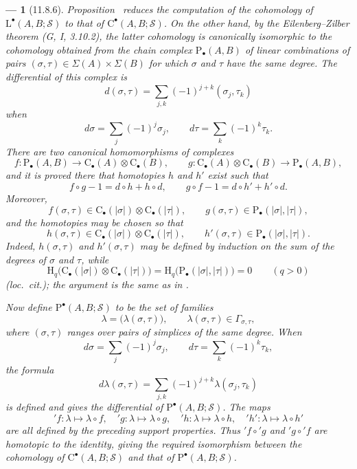 \documentclass[oneside]{amsart}
\theoremstyle{ega-env-style}
\newtheorem*{env}{---}
\theoremstyle{ega-thm-env-style}
\theoremstyle{ega-defn-env-style}
\def\mathcal{\mathscr}
\def\sh{\mathcal}                   %
\def\HH{\mathrm{H}}                 %
\newcommand{\oldpage}[2][]{{\marginnote{\normalfont{\textbf{#1}~|~#2}}}\ignorespaces}
\let\EGAOriginalLabel\label
\renewcommand{\label}[1]{\phantomsection\EGAOriginalLabel{#1}}
\begin{document}
\begin{env}[11.8.6]
\label{0.11.8.6}
\oldpage[0\textsubscript{III}]{45}
Proposition~ reduces the computation of the cohomology of
$\mathrm{L}^\bullet(A,B;\sh{S})$ to that of
$\mathrm{C}^\bullet(A,B;\sh{S})$.
On the other hand, by the Eilenberg--Zilber theorem
(G, I, 3.10.2), the latter cohomology is canonically isomorphic to the
cohomology obtained from the chain complex
$\mathrm{P}_\bullet(A,B)$ of linear combinations of pairs
$(\sigma,\tau)\in\Sigma(A)\times\Sigma(B)$ for which $\sigma$ and
$\tau$ have the same degree.
The differential of this complex is
\[
  d(\sigma,\tau)
  =
  \sum_{j,k}(-1)^{j+k}(\sigma_j,\tau_k)
\]
when
\[
  d\sigma=\sum_j(-1)^j\sigma_j,
  \qquad
  d\tau=\sum_k(-1)^k\tau_k.
\]
There are two canonical homomorphisms of complexes
\[
  f:\mathrm{P}_\bullet(A,B)
  \longrightarrow
  \mathrm{C}_\bullet(A)\otimes\mathrm{C}_\bullet(B),
  \qquad
  g:\mathrm{C}_\bullet(A)\otimes\mathrm{C}_\bullet(B)
  \longrightarrow
  \mathrm{P}_\bullet(A,B),
\]
and it is proved there that homotopies $h$ and $h'$ exist such that
\[
  f\circ g-1=d\circ h+h\circ d,
  \qquad
  g\circ f-1=d\circ h'+h'\circ d.
\]
Moreover,
\[
  f(\sigma,\tau)
  \in
  \mathrm{C}_\bullet(|\sigma|)
  \otimes
  \mathrm{C}_\bullet(|\tau|),
  \qquad
  g(\sigma,\tau)
  \in
  \mathrm{P}_\bullet(|\sigma|,|\tau|),
\]
and the homotopies may be chosen so that
\[
  h(\sigma,\tau)
  \in
  \mathrm{C}_\bullet(|\sigma|)
  \otimes
  \mathrm{C}_\bullet(|\tau|),
  \qquad
  h'(\sigma,\tau)
  \in
  \mathrm{P}_\bullet(|\sigma|,|\tau|).
\]
Indeed, $h(\sigma,\tau)$ and $h'(\sigma,\tau)$ may be defined by
induction on the sum of the degrees of $\sigma$ and $\tau$, while
\[
  \HH_q\bigl(
    \mathrm{C}_\bullet(|\sigma|)
    \otimes
    \mathrm{C}_\bullet(|\tau|)
  \bigr)
  =
  \HH_q\bigl(\mathrm{P}_\bullet(|\sigma|,|\tau|)\bigr)
  =
  0
  \qquad(q>0)
\]
(\emph{loc.\ cit.}); the argument is the same as in
.

Now define $\mathrm{P}^\bullet(A,B;\sh{S})$ to be the set of families
\[
  \lambda=\bigl(\lambda(\sigma,\tau)\bigr),
  \qquad
  \lambda(\sigma,\tau)\in\Gamma_{\sigma,\tau},
\]
where $(\sigma,\tau)$ ranges over pairs of simplices of the same degree.
When
\[
  d\sigma=\sum_j(-1)^j\sigma_j,
  \qquad
  d\tau=\sum_k(-1)^k\tau_k,
\]
the formula
\[
  d\lambda(\sigma,\tau)
  =
  \sum_{j,k}(-1)^{j+k}\lambda(\sigma_j,\tau_k)
\]
is defined and gives the differential of
$\mathrm{P}^\bullet(A,B;\sh{S})$.
The maps
\[
  {}'\!f:\lambda\longmapsto\lambda\circ f,\quad
  {}'\!g:\lambda\longmapsto\lambda\circ g,\quad
  {}'\!h:\lambda\longmapsto\lambda\circ h,\quad
  {}'\!h':\lambda\longmapsto\lambda\circ h'
\]
are all defined by the preceding support properties.
Thus ${}'\!f\circ{}'\!g$ and ${}'\!g\circ{}'\!f$ are homotopic to the
identity, giving the required isomorphism between the cohomology of
$\mathrm{C}^\bullet(A,B;\sh{S})$ and that of
$\mathrm{P}^\bullet(A,B;\sh{S})$.
\end{env}
\end{document}
